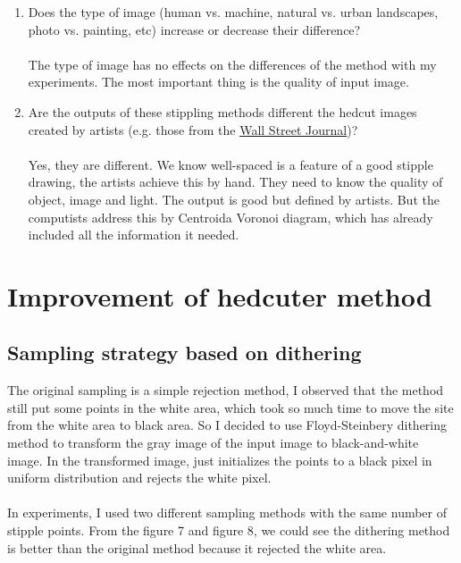 \documentclass[11pt]{article}
\begin{document}
\begin{enumerate}
\item Does the type of image (human vs. machine,  natural vs. urban landscapes, photo vs. painting, etc) increase or decrease their difference? 
\\\\The type of image has no effects on the differences of the method with my experiments. The most important thing is the quality of input image.  

\item Are the outputs of these stippling methods different the hedcut images created by artists (e.g. those from the \href{http://www.wsj.com/articles/SB10001424052748704207504575129961786135180}{Wall Street Journal})? 
\\\\Yes, they are different. We know well-spaced is a feature of a good stipple drawing, the artists achieve this by hand. They need to know the quality of object, image and light. The output is good but defined by artists. But the computists address this by Centroida Voronoi diagram, which has already included all the information it needed.


\end{enumerate}








\section{Improvement of hedcuter method}
\subsection{Sampling strategy based on dithering}
The original sampling is a simple rejection method, I observed that the method still put some points in the
white area, which took so much time to move the site from the white area to black area. So I decided to use Floyd-Steinbery dithering method\cite{floydSteinberg1976dithering} to transform the gray image of the input image to black-and-white image. In the transformed image, just initializes the points to a black pixel in uniform distribution and rejects the white pixel.
\\\\In experiments, I used two different sampling methods with the same number of stipple points. From the figure 7 and figure 8, we could see the dithering method is better than the original method because it rejected the white area. 
\end{document}

